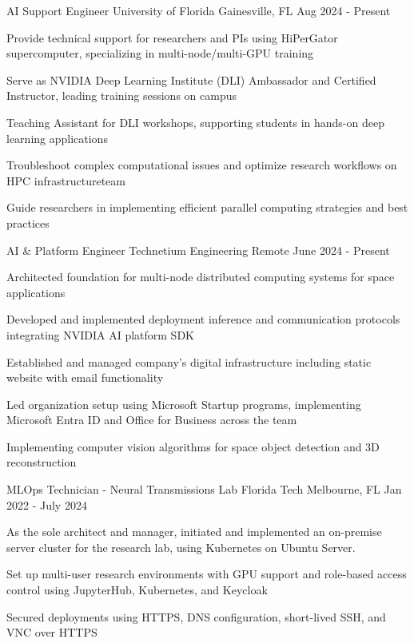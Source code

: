 
\begin{cventries}

	\cventry
	{AI Support Engineer}
	{University of Florida}
	{Gainesville, FL}
	{Aug 2024 - Present}
	{\begin{cvitems}
			\item {Provide technical support for researchers and PIs using HiPerGator supercomputer, specializing in multi-node/multi-GPU training}
			\item {Serve as NVIDIA Deep Learning Institute (DLI) Ambassador and Certified Instructor, leading training sessions on campus}
			\item {Teaching Assistant for DLI workshops, supporting students in hands-on deep learning applications}
			\item {Troubleshoot complex computational issues and optimize research workflows on HPC infrastructureteam}
			\item {Guide researchers in implementing efficient parallel computing strategies and best practices}
		\end{cvitems}}

	\cventry
	{AI \& Platform Engineer}
	{Technetium Engineering}
	{Remote}
	{June 2024 - Present}
	{\begin{cvitems}
			\item {Architected foundation for multi-node distributed computing systems for space applications}
			\item {Developed and implemented deployment inference and communication protocols integrating NVIDIA AI platform SDK}
			\item {Established and managed company's digital infrastructure including static website with email functionality}
			\item {Led organization setup using Microsoft Startup programs, implementing Microsoft Entra ID and Office for Business across the team}
			\item {Implementing computer vision algorithms for space object detection and 3D reconstruction}
		\end{cvitems}}

	\cventry
	{MLOps Technician - Neural Transmissions Lab}
	{Florida Tech}
	{Melbourne, FL}
	{Jan 2022 - July 2024}
	{\begin{cvitems}
			\item {As the sole architect and manager, initiated and implemented an on-premise server cluster for the research lab, using Kubernetes on Ubuntu Server.}
			\item {Set up multi-user research environments with GPU support and role-based access control using JupyterHub, Kubernetes, and Keycloak}
			\item {Secured deployments using HTTPS, DNS configuration, short-lived SSH, and VNC over HTTPS}
		\end{cvitems}}
	

\end{cventries}
